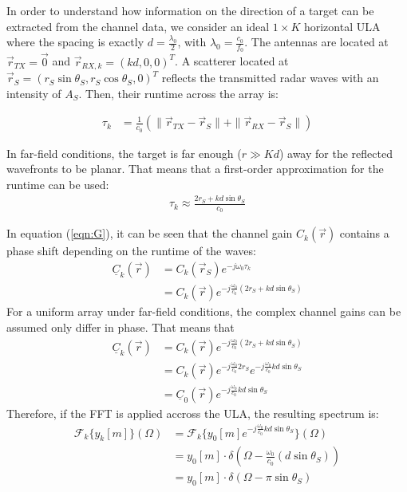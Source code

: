 In order to understand how information on the direction of a target can be extracted from the channel data,
we consider an ideal $1 \times K$ horizontal ULA
where the spacing is exactly $d=\frac{\lambda_0}{2}$, with $\lambda_0 = \frac{c_0}{f_0}$.
The antennas are located at $\vec r_{TX}= \vec 0$ and $\vec r_{RX,k}=(kd,0,0)^T$.
A scatterer located at  $\vec r_S = (r_S\sin\theta_S, r_{S}\cos\theta_S , 0)^T$
reflects the transmitted radar waves with an intensity of $A_S$.
Then, their runtime across the array is:

\begin{align}
    \tau_k & =\frac{1}{c_0} \left( \| \vec r_{TX} - \vec r_S \|+\| \vec r_{RX} - \vec r_S \| \right)
\end{align}

In far-field conditions, the target is far enough ($r \gg K d$) away for the reflected wavefronts to be planar.
That means that a first-order approximation for the runtime can be used:
\begin{align}
    \tau_k \approx \frac{2r_S + kd\sin\theta_S}{c_0}
\end{align}

In equation (\ref{eqn:G}), it can be seen that the channel gain $C_k(\vec r)$
contains a phase shift depending on the runtime of the waves:
\begin{align}
    \underline{C}_k(\vec r) & = C_k(\vec r_S)e^{-j\omega_0\tau_k}                            \\
                            & = C_k(\vec r)e^{-j\frac{\omega_0}{c_0}(2r_S + kd\sin\theta_S)}
\end{align}
For a uniform array under far-field conditions,
the complex channel gains can be assumed only differ in phase. That means that
\begin{align}
    \underline{C}_k(\vec r) & = C_k(\vec r)e^{-j\frac{\omega_0}{c_0}(2r_S + kd\sin\theta_S)}                      \\
                            & = C_k(\vec r)e^{-j\frac{\omega_0}{c_0}2r_S}e^{-j\frac{\omega_0}{c_0}kd\sin\theta_S} \\
                            & = \underline C_0(\vec r)e^{-j\frac{\omega_0}{c_0}kd\sin\theta_S}
\end{align}
Therefore, if the FFT is applied accross the ULA, the resulting spectrum is:
\begin{align}
    \mathcal{F}_k\{y_k[m]\}(\Omega) & = \mathcal{F}_k\{y_0[m]e^{-j \frac{\omega_0}{c_0}kd\sin\theta_S}\}(\Omega)      \\
                                    & = y_0[m] \cdot \delta \left(\Omega -\frac{\omega_0}{c_0}(d\sin\theta_S) \right) \\
                                    & = y_0[m] \cdot \delta \left(\Omega - \pi\sin\theta_S \right)                    \\
\end{align}

